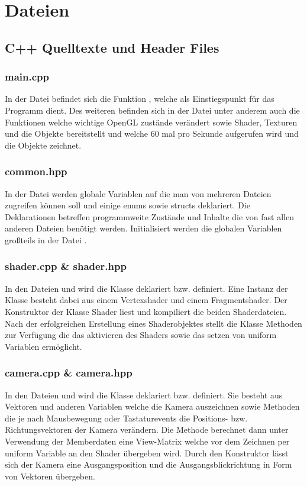 \documentclass{article}
\begin{document}
\section{Dateien}
\subsection{C++ Quelltexte und Header Files}
\subsubsection{main.cpp}
In der Datei  befindet sich die Funktion , welche als Einstiegspunkt für das Programm dient.
Des weiteren befinden sich in der Datei  unter anderem auch die Funktionen  welche
wichtige OpenGL zustände verändert sowie Shader, Texturen und die Objekte bereitstellt und 
welche 60 mal pro Sekunde aufgerufen wird und die Objekte zeichnet. 
\subsubsection{common.hpp}
In der Datei  werden globale Variablen auf die man von mehreren Dateien zugreifen können soll 
und einige enums sowie structs deklariert. Die Deklarationen betreffen programmweite Zustände und Inhalte die
von fast allen anderen Dateien benötigt werden. Initialisiert werden die globalen Variablen großteils in
der Datei .
\subsubsection{shader.cpp \& shader.hpp}
In den Dateien  und  wird die Klasse  deklariert bzw. definiert.
Eine Instanz der Klasse besteht dabei aus einem Vertexshader und einem Fragmentshader.
Der Konstruktor der Klasse Shader liest und kompiliert die beiden Shaderdateien. Nach der erfolgreichen
Erstellung eines Shaderobjektes stellt die Klasse Methoden zur Verfügung die das aktivieren des Shaders sowie 
das setzen von uniform Variablen ermöglicht.
\subsubsection{camera.cpp \& camera.hpp}
In den Dateien  und  wird die Klasse  deklariert bzw. definiert.
Sie besteht aus Vektoren und anderen Variablen welche die Kamera auszeichnen sowie Methoden die je nach 
Mausbewegung oder Tastaturevents die Positions- bzw. Richtungsvektoren der Kamera verändern. Die Methode
 berechnet dann unter Verwendung der Memberdaten eine View-Matrix welche vor dem Zeichnen
per uniform Variable an den Shader übergeben wird. Durch den Konstruktor lässt sich der Kamera eine Ausgangsposition
und die Ausgangsblickrichtung in Form von Vektoren übergeben.
\end{document}

